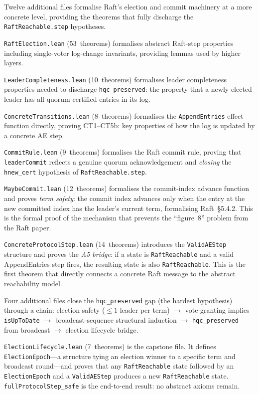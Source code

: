 \documentclass[sigconf,10pt]{acmart}
\begin{document}
Twelve additional files formalise Raft's election and commit machinery
at a more concrete level, providing the theorems that fully discharge the
\texttt{RaftReachable.step} hypotheses.

\texttt{RaftElection.lean} (53~theorems) formalises abstract Raft-step
properties including single-voter log-change invariants, providing
lemmas used by higher layers.

\texttt{LeaderCompleteness.lean} (10~theorems) formalises leader
completeness properties needed to discharge \texttt{hqc\_preserved}: the
property that a newly elected leader has all quorum-certified entries
in its log.

\texttt{ConcreteTransitions.lean} (8~theorems) formalises the
\texttt{AppendEntries} effect function directly, proving CT1--CT5b:
key properties of how the log is updated by a concrete AE step.

\texttt{CommitRule.lean} (9~theorems) formalises the Raft commit rule,
proving that \texttt{leaderCommit} reflects a genuine quorum
acknowledgement and \emph{closing} the
\texttt{hnew\_cert} hypothesis of \texttt{RaftReachable.step}.

\texttt{MaybeCommit.lean} (12~theorems) formalises the commit-index
advance function and proves \emph{term safety}: the commit index
advances only when the entry at the new committed index has
the leader's current term, formalising Raft~\S5.4.2.
This is the formal proof of the mechanism that prevents the ``figure~8''
problem from the Raft paper.

\texttt{ConcreteProtocolStep.lean} (14~theorems) introduces the
\texttt{ValidAEStep} structure and proves the \emph{A5 bridge}:
if a state is \texttt{RaftReachable} and a valid AppendEntries step fires,
the resulting state is also \texttt{RaftReachable}.  This is
the first theorem that directly connects a concrete Raft message to the
abstract reachability model.

Four additional files close the \texttt{hqc\_preserved} gap
(the hardest hypothesis) through a chain: election safety
($\leq 1$ leader per term) $\to$ vote-granting implies
\texttt{isUpToDate} $\to$ broadcast-sequence structural induction
$\to$ \texttt{hqc\_preserved} from broadcast $\to$ election
lifecycle bridge.

\texttt{ElectionLifecycle.lean} (7~theorems) is the capstone
file.  It defines \texttt{ElectionEpoch}---a
structure tying an election winner to a specific term and broadcast
round---and proves that any \texttt{RaftReachable} state followed by an
\texttt{ElectionEpoch} and a \texttt{ValidAEStep} produces a new
\texttt{RaftReachable} state.
\texttt{fullProtocolStep\_safe}
is the end-to-end result: no abstract axioms remain.
\end{document}
